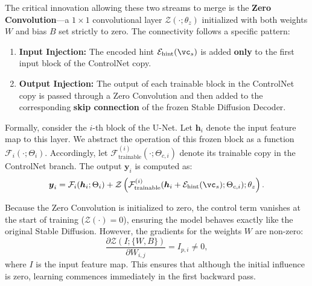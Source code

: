 \documentclass[../../book-main.tex]{subfiles}
\begin{document}
The critical innovation allowing these two streams to merge is the
\textbf{Zero Convolution}—a $1 \times 1$ convolutional layer
$\mathcal{Z}(\cdot; \theta_z)$ initialized with both weights $W$ and
bias $B$ set strictly to zero. The connectivity follows a specific pattern:
\begin{enumerate}
\item \textbf{Input Injection:} The encoded hint
    $\mathcal{E}_{\text{hint}}(\vc_s)$ is added \textbf{only} to the
    first input block of the ControlNet copy.
\item \textbf{Output Injection:} The output of each trainable block
    in the ControlNet copy is passed through a Zero Convolution and
    then added to the corresponding \textbf{skip connection} of the
    frozen Stable Diffusion Decoder.
\end{enumerate}

Formally, consider the $i$-th block of the U-Net. Let
$\boldsymbol{h}_i$ denote the input feature map to this layer. We
abstract the operation of this frozen block as a function
$\mathcal{F}_i(\cdot; \Theta_i)$. Accordingly, let
$\mathcal{F}_{\text{trainable}}^{(i)}(\cdot; \Theta_{c,i})$ denote
its trainable copy in the ControlNet branch. The output
$\boldsymbol{y}_i$ is computed as:
\begin{equation}
\boldsymbol{y}_i = \mathcal{F}_i(\boldsymbol{h}_i; \Theta_i) +
\mathcal{Z}\left(
    \mathcal{F}_{\text{trainable}}^{(i)}(\boldsymbol{h}_i +
\mathcal{E}_{\text{hint}}(\vc_s); \Theta_{c,i}); \theta_z \right).
\label{eq:controlnet}
\end{equation}

Because the Zero Convolution is initialized to zero, the control term
vanishes at the start of training ($\mathcal{Z}(\cdot) = 0$),
ensuring the model behaves exactly like the original Stable
Diffusion. However, the gradients for the weights $W$ are non-zero:
\begin{equation}
\frac{\partial \mathcal{Z}(I; \{W, B\})}{\partial W_{i,j}} = I_{p,i} \neq 0,
\end{equation}
where $I$ is the input feature map. This ensures that although the
initial influence is zero, learning commences immediately in the
first backward pass.
\end{document}
